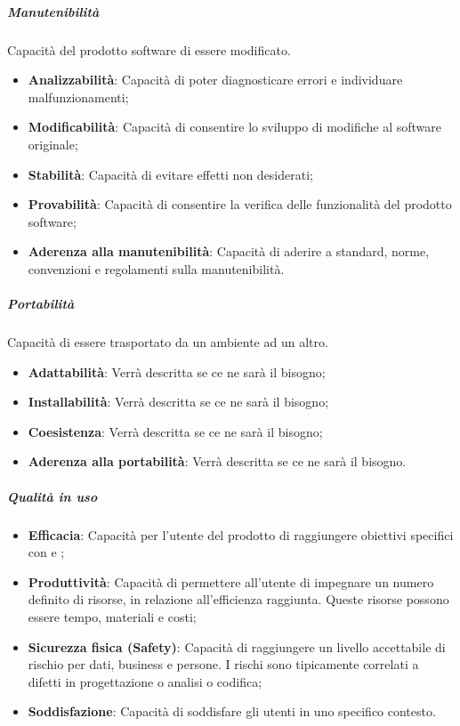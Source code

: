 \subparagraph*{Manutenibilità}
Capacità del prodotto software di essere modificato.
\begin{itemize}
\item \textbf{Analizzabilità}: Capacità di poter diagnosticare errori e individuare malfunzionamenti;
\item \textbf{Modificabilità}: Capacità di consentire lo sviluppo di modifiche al software originale;
\item \textbf{Stabilità}: Capacità di evitare effetti non desiderati;
\item \textbf{Provabilità}: Capacità di consentire la verifica delle funzionalità del prodotto software;
\item \textbf{Aderenza alla manutenibilità}: Capacità di aderire a standard, norme, convenzioni e regolamenti sulla manutenibilità.
\end{itemize}

\subparagraph*{Portabilità}
Capacità di essere trasportato da un ambiente ad un altro.
\begin{itemize}
\item \textbf{Adattabilità}: Verrà descritta se ce ne sarà il bisogno;
\item \textbf{Installabilità}: Verrà descritta se ce ne sarà il bisogno;
\item \textbf{Coesistenza}: Verrà descritta se ce ne sarà il bisogno;
\item \textbf{Aderenza alla portabilità}: Verrà descritta se ce ne sarà il bisogno.
\end{itemize}

\subparagraph*{Qualità in uso}
\begin{itemize}
\item \textbf{Efficacia}: Capacità per l'utente del prodotto di raggiungere obiettivi specifici con  e ;
\item \textbf{Produttività}: Capacità di permettere all’utente di impegnare un numero definito di risorse, in relazione all’efficienza raggiunta. Queste risorse possono essere tempo, materiali e costi;
\item \textbf{Sicurezza fisica (Safety)}: Capacità di raggiungere un livello accettabile di rischio per dati, business e persone. I rischi sono tipicamente correlati a difetti in progettazione o analisi o codifica;
\item \textbf{Soddisfazione}: Capacità di soddisfare gli utenti in uno specifico contesto.
\end{itemize}